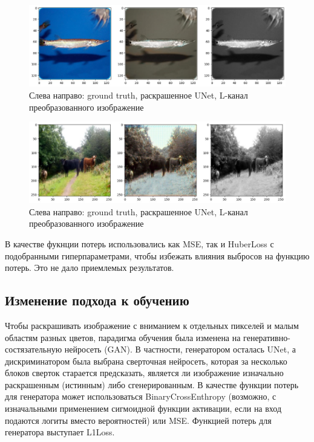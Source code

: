 \documentclass[14pt]{article}
\begin{document}
\begin{figure}[H]
    \centering
    \includegraphics[width=1.0\textwidth]{resources/bad_fish_colorization.png}
    \caption{Слева направо: ground truth, раскрашенное UNet, L-канал преобразованного изображение}
    \label{fig:id_figura}
\end{figure}


\begin{figure}[H]
    \centering
    \includegraphics[width=1.0\textwidth]{resources/bad_cows_colorization.png}
    \caption{Слева направо: ground truth, раскрашенное UNet, L-канал преобразованного изображение}
    \label{fig:id_figura}
\end{figure}

В качестве фукнции потерь использовались как MSE, так и HuberLoss с подобранными гиперпараметрами, чтобы избежать влияния выбросов на функцию потерь. Это не дало
приемлемых результатов.

\subsection{Изменение подхода к обучению}

Чтобы раскрашивать изображение с вниманием к отдельных пикселей и малым областям разных цветов, парадигма обучения была изменена на генеративно-состязательную нейросеть (GAN).
В частности, генератором осталась UNet, а дискриминатором была выбрана сверточная нейросеть, которая за несколько блоков сверток
старается предсказать, является ли изображение изначально раскрашенным (истинным) либо сгенерированным. В качестве функции потерь для генератора может использоваться
BinaryCrossEnthropy (возможно, с изначальными применением сигмоидной функции активации, если на вход подаются логиты вместо вероятностей) или MSE. Функцией
потерь для генератора выступает L1Loss.
\end{document}

